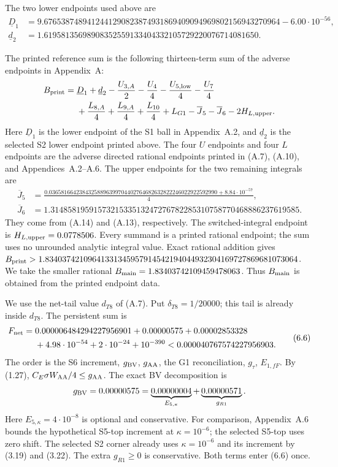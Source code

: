 The two lower endpoints used above are
{\small
\[
\begin{aligned}
\underline D_1&=9.6765387489412441290823874931869409094969802156943270964
                 -6.00\cdot10^{-56},\\
\underline d_2&=1.61958135698908352559133404332105729220076714081650.
\end{aligned}
\]
}

The printed reference sum is the following thirteen-term sum of the
adverse endpoints in Appendix~A:
\[
\begin{aligned}
B_{\rm print}={}&\underline D_1+\underline d_2-\frac{U_{3,A}}2-\frac{U_4}4
-\frac{U_{5,\rm low}}4-\frac{U_7}4\\
&+\frac{L_{8,A}}4+\frac{L_{9,A}}4+\frac{L_{10}}4+L_{G1}
-\overline J_5-\overline J_6-2H_{L,\rm upper}.
\end{aligned}
\]
Here $\underline D_1$ is the lower endpoint of the S1 ball in Appendix~A.2,
and $\underline d_2$ is the selected S2 lower endpoint printed above.
The four $U$ endpoints and four $L$ endpoints are the adverse directed
rational endpoints printed in (A.7), (A.10), and Appendices~A.2--A.6.
The upper endpoints for the two remaining integrals are
{\small
\[
\begin{aligned}
\overline J_5&=\frac{0.03658166423843258896399704402764682632822246022922592990
                    +8.84\cdot10^{-57}}4,\\
\overline J_6&=1.3148581959157321533513247276782285310758770468886237619585.
\end{aligned}
\]
}
They come from (A.14) and (A.13), respectively.
The switched-integral endpoint is $H_{L,\rm upper}=0.0778506$.
Every summand is a printed rational endpoint; the sum uses no unrounded
analytic integral value.
Exact rational addition gives
$B_{\rm print}>1.83403742109641331345957914542194044932304169727869681073064$.
We take the smaller rational $B_{\rm main}=1.83403742109459478063$.
Thus $B_{\rm main}$ is obtained from the printed endpoint data.

We use the net-tail value $d_{T8}$ of (A.7).
Put $\delta_{T8}=1/20000$; this tail is already inside $d_{T8}$.
The persistent sum is
\[
\begin{split}
F_{\rm net}={}&0.000006484294227956901+0.00000575+0.00002853328\\
&+4.98\cdot10^{-54}+2\cdot10^{-24}+10^{-390}
<0.000040767574227956903.
\end{split}\tag{6.6}
\]
The order is the S6 increment, $g_{\rm BV}$, $g_{\rm AA}$,
the G1 reconciliation, $g_\tau$, $E_{1,fF}$.
By (1.27), $C_E\sigma W_{\rm AA}/4\le g_{\rm AA}$.
The exact BV decomposition is
\[
g_{\rm BV}=0.00000575
=\underbrace{0.00000004}_{E_{5,\kappa}}
+\underbrace{0.00000571}_{g_{R1}}.
\]
Here $E_{5,\kappa}=4\cdot10^{-8}$ is optional and conservative.
For comparison, Appendix~A.6 bounds the hypothetical S5-top increment
at $\kappa=10^{-6}$; the selected S5-top uses zero shift.
The selected S2 corner already uses $\kappa=10^{-6}$ and its increment
by (3.19) and (3.22).
The extra $g_{R1}\ge0$ is conservative. Both terms enter (6.6) once.

